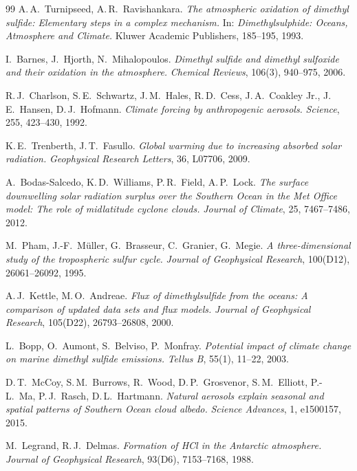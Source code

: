 ﻿\documentclass[a4paper,12pt]{article}
\theoremstyle{definition}
\begin{document}
\begin{thebibliography}{99}
A.\,A.~Turnipseed, A.\,R.~Ravishankara.
\textit{The atmospheric oxidation of dimethyl sulfide: Elementary steps in a complex
mechanism.}
In: \textit{Dimethylsulphide: Oceans, Atmosphere and Climate.}
Kluwer Academic Publishers, 185--195, 1993.

I.~Barnes, J.~Hjorth, N.~Mihalopoulos.
\textit{Dimethyl sulfide and dimethyl sulfoxide and their oxidation in the atmosphere.}
\textit{Chemical Reviews}, 106(3), 940--975, 2006.

R.\,J.~Charlson, S.\,E.~Schwartz, J.\,M.~Hales, R.\,D.~Cess, J.\,A.~Coakley Jr.,
J.\,E.~Hansen, D.\,J.~Hofmann.
\textit{Climate forcing by anthropogenic aerosols.}
\textit{Science}, 255, 423--430, 1992.

K.\,E.~Trenberth, J.\,T.~Fasullo.
\textit{Global warming due to increasing absorbed solar radiation.}
\textit{Geophysical Research Letters}, 36, L07706, 2009.

A.~Bodas-Salcedo, K.\,D.~Williams, P.\,R.~Field, A.\,P.~Lock.
\textit{The surface downwelling solar radiation surplus over the Southern Ocean in the
Met Office model: The role of midlatitude cyclone clouds.}
\textit{Journal of Climate}, 25, 7467--7486, 2012.

M.~Pham, J.-F.~Müller, G.~Brasseur, C.~Granier, G.~Megie.
\textit{A three-dimensional study of the tropospheric sulfur cycle.}
\textit{Journal of Geophysical Research}, 100(D12), 26061--26092, 1995.

A.\,J.~Kettle, M.\,O.~Andreae.
\textit{Flux of dimethylsulfide from the oceans: A comparison of updated data sets and
flux models.}
\textit{Journal of Geophysical Research}, 105(D22), 26793--26808, 2000.

L.~Bopp, O.~Aumont, S.~Belviso, P.~Monfray.
\textit{Potential impact of climate change on marine dimethyl sulfide emissions.}
\textit{Tellus B}, 55(1), 11--22, 2003.

D.\,T.~McCoy, S.\,M.~Burrows, R.~Wood, D.\,P.~Grosvenor, S.\,M.~Elliott,
P.-L.~Ma, P.\,J.~Rasch, D.\,L.~Hartmann.
\textit{Natural aerosols explain seasonal and spatial patterns of Southern Ocean cloud
albedo.}
\textit{Science Advances}, 1, e1500157, 2015.

M.~Legrand, R.\,J.~Delmas.
\textit{Formation of HCl in the Antarctic atmosphere.}
\textit{Journal of Geophysical Research}, 93(D6), 7153--7168, 1988.


\end{thebibliography}
\end{document}
